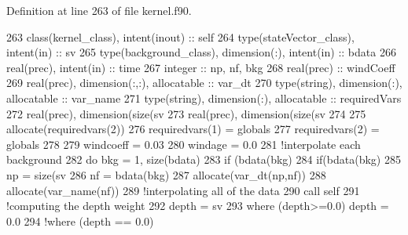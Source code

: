 Definition at line 263 of file kernel.\+f90.


\begin{DoxyCode}
263     \textcolor{keywordtype}{class}(kernel\_class), \textcolor{keywordtype}{intent(inout)} :: self
264     \textcolor{keywordtype}{type}(stateVector\_class), \textcolor{keywordtype}{intent(in)} :: sv
265     \textcolor{keywordtype}{type}(background\_class), \textcolor{keywordtype}{dimension(:)}, \textcolor{keywordtype}{intent(in)} :: bdata
266     \textcolor{keywordtype}{real(prec)}, \textcolor{keywordtype}{intent(in)} :: time
267     \textcolor{keywordtype}{integer} :: np, nf, bkg
268     \textcolor{keywordtype}{real(prec)} :: windCoeff
269     \textcolor{keywordtype}{real(prec)}, \textcolor{keywordtype}{dimension(:,:)}, \textcolor{keywordtype}{allocatable} :: var\_dt
270     \textcolor{keywordtype}{type}(string), \textcolor{keywordtype}{dimension(:)}, \textcolor{keywordtype}{allocatable} :: var\_name
271     \textcolor{keywordtype}{type}(string), \textcolor{keywordtype}{dimension(:)}, \textcolor{keywordtype}{allocatable} :: requiredVars
272     \textcolor{keywordtype}{real(prec)}, \textcolor{keywordtype}{dimension(size(sv%
273     \textcolor{keywordtype}{real(prec)}, \textcolor{keywordtype}{dimension(size(sv%
274 
275     \textcolor{keyword}{allocate}(requiredvars(2))
276     requiredvars(1) = globals%
277     requiredvars(2) = globals%
278 
279     windcoeff = 0.03
280     windage = 0.0
281     \textcolor{comment}{!interpolate each background}
282     \textcolor{keywordflow}{do} bkg = 1, \textcolor{keyword}{size}(bdata)
283         \textcolor{keywordflow}{if} (bdata(bkg)%
284             \textcolor{keywordflow}{if}(bdata(bkg)%
285                 np = \textcolor{keyword}{size}(sv%
286                 nf = bdata(bkg)%
287                 \textcolor{keyword}{allocate}(var\_dt(np,nf))
288                 \textcolor{keyword}{allocate}(var\_name(nf))
289                 \textcolor{comment}{!interpolating all of the data}
290                 \textcolor{keyword}{call }self%
291                 \textcolor{comment}{!computing the depth weight}
292                 depth = sv%
293                 \textcolor{keywordflow}{where} (depth>=0.0) depth = 0.0
294                 \textcolor{comment}{!where (depth == 0.0) }
}}
\end{DoxyCode}
